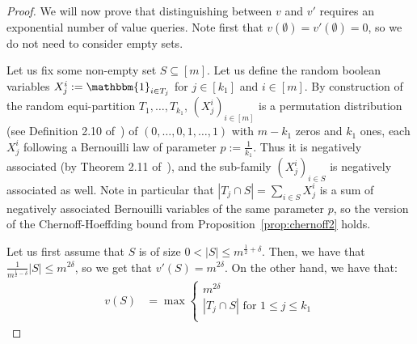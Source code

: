 \begin{proof}
  We will now prove that distinguishing between $v$ and $v'$ requires an exponential number of value queries. Note first that $v(\emptyset) = v'(\emptyset) = 0$, so we do not need to consider empty sets.

  Let us fix some non-empty set $S \subseteq [m]$. Let us define the random boolean variables $X_j^i := \mathbbm{1}_{i \in T_j}$ for $j \in [k_1]$ and $i \in [m]$. By construction of the random equi-partition $T_1, \ldots, T_{k_1}$, $(X_j^i)_{i \in [m]}$ is a permutation distribution (see Definition 2.10 of~\cite{JP83}) of $(0,\ldots,0,1,\ldots,1)$ with $m-k_1$ zeros and $k_1$ ones, each $X_j^i$ following a Bernouilli law of parameter $p := \frac{1}{k_1}$. Thus it is negatively associated (by Theorem 2.11 of~\cite{JP83}), and the sub-family $(X_j^i)_{i \in S}$ is negatively associated as well. Note in particular that $|T_j \cap S| = \sum_{i \in S} X_j^i$ is a sum of negatively associated Bernouilli variables of the same parameter $p$, so the version of the Chernoff-Hoeffding bound from Proposition~\ref{prop:chernoff2} holds.
  
  Let us first assume that $S$ is of size $0 < |S| \leq m^{\frac{1}{2}+\delta}$. Then, we have that $\frac{1}{m^{\frac{1}{2}-\delta}}|S| \leq m^{2\delta}$, so we get that $v'(S) = m^{2\delta}$. On the other hand, we have that:
    \begin{equation}
    \begin{aligned}
      v(S) &= \max\begin{cases}
      m^{2\delta}\\
      |T_j \cap S| \text{ for } 1 \leq j \leq k_1\\
      \end{cases}
    \end{aligned}
    \end{equation}


\end{proof}
